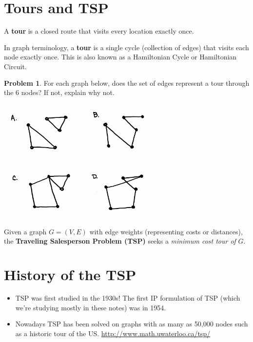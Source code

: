 \documentclass[11pt]{article}
\theoremstyle{definition}
\newtheorem{problem}{Problem}
\begin{document}
\newpage
\section{Tours and TSP}

\begin{tcolorbox}
A \textbf{tour} is a closed route that visits every location exactly once.

\smallskip
In graph terminology, a \textbf{tour} is a single cycle (collection of edges) that visits each node exactly once. This is also known as a Hamiltonian Cycle or Hamiltonian Circuit.
\end{tcolorbox}

\begin{problem}
For each graph below, does the set of edges represent a tour through the 6 nodes?  If not, explain why not.

\begin{center}
\includegraphics[width=0.6\textwidth]{tours}
\end{center}
\end{problem}

\begin{tcolorbox}
Given a graph $G = (V, E)$ with edge weights (representing costs or distances), the \textbf{Traveling Salesperson Problem (TSP)} seeks a \emph{minimum cost tour of} $G$.
\end{tcolorbox}

\section{History of the TSP}

\begin{itemize}
\item TSP was first studied in the 1930s! The first IP formulation of TSP (which we're studying mostly in these notes) was in 1954.
\item Nowadays TSP has been solved on graphs with as many as 50,000 nodes such as a historic tour of the US.
\url{http://www.math.uwaterloo.ca/tsp/}
\end{itemize}
\end{document}
